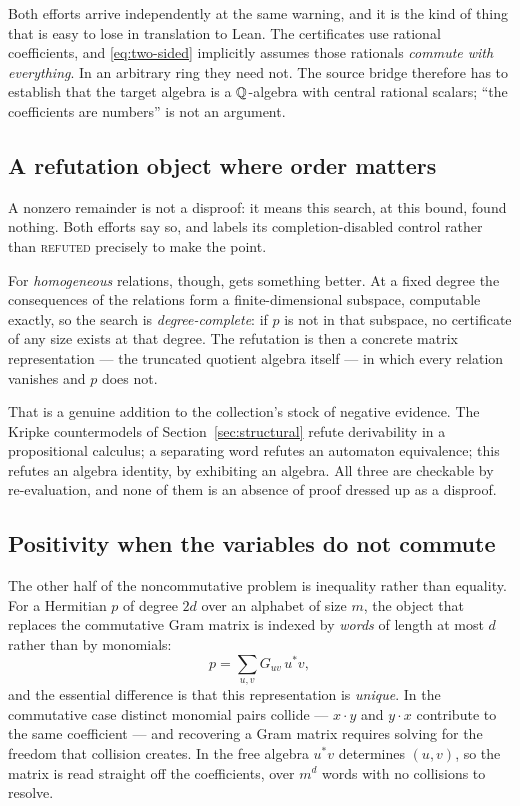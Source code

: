 \begin{remark}
Both efforts arrive independently at the same warning, and it is the kind of
thing that is easy to lose in translation to Lean. The certificates use
rational coefficients, and \eqref{eq:two-sided} implicitly assumes those
rationals \emph{commute with everything}. In an arbitrary ring they need not.
The source bridge therefore has to establish that the target algebra is a
$\mathbb{Q}$-algebra with central rational scalars; ``the coefficients are numbers'' is
not an argument.
\end{remark}

\subsection{A refutation object where order matters}

A nonzero remainder is not a disproof: it means this search, at this bound,
found nothing. Both efforts say so, and  labels its completion-disabled
control \unknown{} rather than \textsc{refuted} precisely to make the point.

For \emph{homogeneous} relations, though,  gets something better. At a
fixed degree the consequences of the relations form a finite-dimensional
subspace, computable exactly, so the search is \emph{degree-complete}: if $p$ is
not in that subspace, no certificate of any size exists at that degree. The
refutation is then a concrete matrix representation --- the truncated quotient
algebra itself --- in which every relation vanishes and $p$ does not.

That is a genuine addition to the collection's stock of negative evidence. The
Kripke countermodels of Section~\ref{sec:structural} refute derivability in a
propositional calculus; a separating word refutes an automaton equivalence; this
refutes an algebra identity, by exhibiting an algebra. All three are checkable
by re-evaluation, and none of them is an absence of proof dressed up as a
disproof.

\subsection{Positivity when the variables do not commute}

The other half of the noncommutative problem is inequality rather than equality.
For a Hermitian $p$ of degree $2d$ over an alphabet of size $m$, the object that
replaces the commutative Gram matrix is indexed by \emph{words} of length at
most $d$ rather than by monomials:
\[
 p=\sum_{u,v} G_{uv}\, u^{*}v,
\]
and the essential difference is that this representation is \emph{unique}. In
the commutative case distinct monomial pairs collide --- $x\cdot y$ and $y\cdot
x$ contribute to the same coefficient --- and recovering a Gram matrix requires
solving for the freedom that collision creates. In the free algebra
$u^{*}v$ determines $(u,v)$, so the matrix is read straight off the
coefficients, over $m^d$ words with no collisions to resolve.

